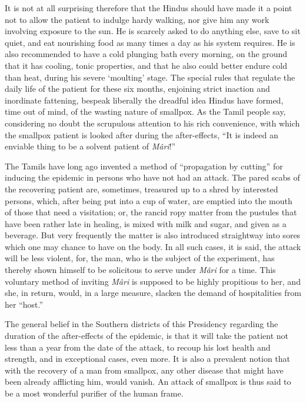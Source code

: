 \documentclass[a4paper, 12pt, oneside, english, twocolumn]{article}
\begin{document}
It is not at all surprising therefore that the Hindus should have made it a point not to allow the patient to indulge hardy walking, nor give him any work involving exposure to the sun. He is scarcely asked to do anything else, save to sit quiet, and eat nourishing food as many times a day as his system requires. He is also recommended to have a cold plunging bath every morning, on the ground that it has cooling, tonic properties, and that he also could better endure cold than heat, during his severe `moulting' stage. The special rules that regulate the daily life of the patient for these six months, enjoining strict inaction and inordinate fattening, bespeak liberally the dreadful idea Hindus have formed, time out of mind, of the wasting nature of smallpox. As the Tamil people say, considering no doubt the scrupulous attention to his rich convenience, with which the smallpox patient is looked after during the after-effects, ``It is indeed an enviable thing to be a solvent patient of \emph{Mâri}!''

The Tamils have long ago invented a method of ``propagation by cutting'' for inducing the epidemic in persons who have not had an attack. The pared scabs of the recovering patient are, sometimes, treasured up to a shred by interested persons, which, after being put into a cup of water, are emptied into the mouth of those that need a visitation; or, the rancid ropy matter from the pustules that have been rather late in healing, is mixed with milk and sugar, and given as a beverage. But very frequently the matter is also introduced straightway into sores which one may chance to have on the body. In all such cases, it is said, the attack will be less violent, for, the man, who is the subject of the experiment, has thereby shown himself to be solicitous to serve under \emph{Mâri} for a time. This voluntary method of inviting \emph{Mâri} is supposed to be highly propitious to her, and she, in return, would, in a large measure, slacken the demand of hospitalities from her ``host.''

The general belief in the Southern districts of this Presidency regarding the duration of the after-effects of the epidemic, is that it will take the patient not less than a year from the date of the attack, to recoup his lost health and strength, and in exceptional cases, even more. It is also a prevalent notion that with the recovery of a man from smallpox, any other disease that might have been already afflicting him, would vanish. An attack of smallpox is thus said to be a most wonderful purifier of the human frame.
\end{document}
